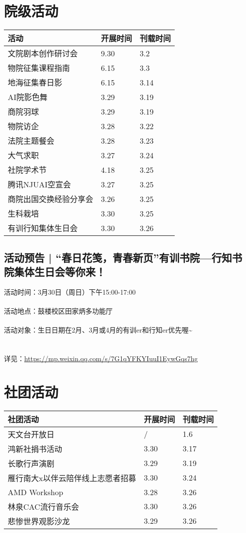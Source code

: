 \documentclass[letterpaper, 12pt]{article}
\begin{document}
\begin{multicols}{2}
\section{院级活动}
\begin{tabular}{|>{\centering\arraybackslash}m{}|m{}|m{}|}
\hline
    活动 & 开展时间 & 刊载时间\\
    \hline\hline
    文院剧本创作研讨会 & 9.30 & 3.2\\
    物院征集课程指南 & 6.15 & 3.3\\
    地海征集春日影 & 6.15 & 3.14\\
    AI院影色舞 & 3.29 & 3.19\\
    商院羽球 & 3.29 & 3.19\\
    物院访企 & 3.28 & 3.22\\
    法院主题餐会 & 3.28 & 3.23\\
    大气求职 & 3.27 & 3.24\\
    社院学术节 & 4.18 & 3.25\\
    腾讯NJUAI空宣会 & 3.27 & 3.25\\
    商院出国交换经验分享会 & 3.26 & 3.25\\
    生科栽培 & 3.30 & 3.25\\
    有训行知集体生日会 & 3.30 & 3.26\\
    \hline
\end{tabular}
\subsection{活动预告 | “春日花笺，青春新页”有训书院—行知书院集体生日会等你来！}
活动时间：3月30日（周日）下午15:00-17:00
\\
\\活动地点：鼓楼校区田家炳多功能厅
\\
\\活动对象：生日日期在2月、3月或4月的有训er和行知er优先喔\textasciitilde{}
\\
\\
\\详见：\url{https://mp.weixin.qq.com/s/7G1qYFKYIuuI1EywGqs7hg}


\section{社团活动}
\begin{tabular}{|>{\centering\arraybackslash}m{}|m{}|m{}|}
    \hline
    社团活动 & 开展时间 & 刊载时间\\
    \hline\hline
    天文台开放日 & / & 1.6\\
    鸿新社捐书活动 & 3.30 & 3.17\\
    长歌行声演剧 & 3.29 & 3.19\\
    雁行南大x以伴云陪伴线上志愿者招募 & 3.30 & 3.24\\
    AMD Workshop & 3.28 & 3.26\\
    林泉CAC流行音乐会 & 3.30 & 3.26\\
    悲惨世界观影沙龙 & 3.29 & 3.26\\
    \hline
\end{tabular}

\end{multicols}
\end{document}
